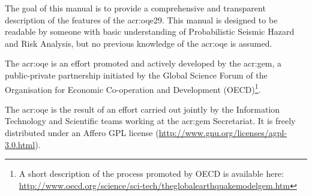 The goal of this manual is to provide a comprehensive and transparent
description of the features of the \glsdesc{acr:oqe29}. This manual is
designed to be readable by someone with basic understanding of Probabilistic
Seismic Hazard and Risk Analysis, but no previous knowledge of the
\glsdesc{acr:oqe} is assumed.

The \glsdesc{acr:oqe} is an effort promoted and actively developed by the
\glsdesc{acr:gem}, a public-private partnership initiated by the
Global Science Forum of the Organisation for Economic Co-operation and Development
(OECD)\footnote{A short description of the process promoted by OECD is available here:\\\href{http://www.oecd.org/science/sci-tech/theglobalearthquakemodelgem.htm}{http://www.oecd.org/science/sci-tech/theglobalearthquakemodelgem.htm}}.

The \glsdesc{acr:oqe} is the result of an effort carried out jointly by the
Information Technology and Scientific teams working at the \gls{acr:gem} Secretariat.
It is freely distributed under an Affero GPL license
(\href{http://www.gnu.org/licenses/agpl-3.0.html}{http://www.gnu.org/licenses/agpl-3.0.html}).
